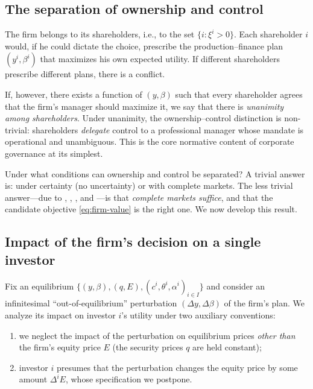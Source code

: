 \documentclass[11pt,a4paper,oneside]{book}
\theoremstyle{plain}
\theoremstyle{definition}
\theoremstyle{remark}
\numberwithin{equation}{chapter}
\begin{document}
\subsection{The separation of ownership and control}

The firm belongs to its shareholders, i.e., to the set $\{ i \colon \xi^i > 0 \}$.
Each shareholder $i$ would, if he could dictate the choice, prescribe the production--finance plan $(y^i, \beta^i)$ that maximizes his own expected utility.
If different shareholders prescribe different plans, there is a conflict.

If, however, there exists a function of $(y, \beta)$ such that every shareholder agrees that the firm's manager should maximize it, we say that there is \emph{unanimity among shareholders}.
Under unanimity, the ownership--control distinction is non-trivial: shareholders \emph{delegate} control to a professional manager whose mandate is operational and unambiguous.
This is the core normative content of corporate governance at its simplest.

Under what conditions can ownership and control be separated?
A trivial answer is: under certainty (no uncertainty) or with complete markets.
The less trivial answer---due to \citet{Fisher1930}, \citet{Dreze1974}, \citet{GrossmanHart1979}, and \citet{GrossmanStiglitz1980}---is that \emph{complete markets suffice}, and that the candidate objective \eqref{eq:firm-value} is the right one.
We now develop this result.

\subsection{Impact of the firm's decision on a single investor}

Fix an equilibrium $\{ (y, \beta), (q, E), (c^i, \theta^i, \alpha^i)_{i \in I} \}$ and consider an infinitesimal ``out-of-equilibrium'' perturbation $(\Delta y, \Delta \beta)$ of the firm's plan.
We analyze its impact on investor $i$'s utility under two auxiliary conventions:
\begin{enumerate}
  \item we neglect the impact of the perturbation on equilibrium prices \emph{other than} the firm's equity price $E$ (the security prices $q$ are held constant);
  \item investor $i$ presumes that the perturbation changes the equity price by some amount $\Delta^i E$, whose specification we postpone.
\end{enumerate}
\end{document}
